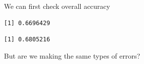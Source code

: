 \documentclass[
  letterpaper,
  DIV=11,
  numbers=noendperiod]{scrreprt}
\newenvironment{Shaded}{\begin{snugshade}}{\end{snugshade}}
\newcommand{\FunctionTok}[1]{\textcolor[rgb]{0.28,0.35,0.67}{#1}}
\newcommand{\NormalTok}[1]{\textcolor[rgb]{0.00,0.23,0.31}{#1}}
\newcommand{\SpecialCharTok}[1]{\textcolor[rgb]{0.37,0.37,0.37}{#1}}
\begin{document}
We can first check overall accuracy

\begin{Shaded}
\end{Shaded}

\begin{verbatim}
[1] 0.6696429
\end{verbatim}

\begin{Shaded}
\end{Shaded}

\begin{verbatim}
[1] 0.6805216
\end{verbatim}

But are we making the same types of errors?
\end{document}
